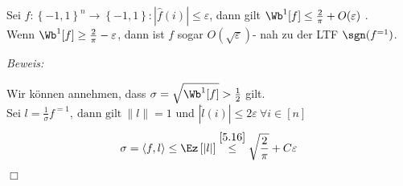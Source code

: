 \documentclass{article}
\newenvironment{proof}{
	\textit{Beweis: \\}
}{
	\begin{flushright}
		$\Box$ 
	\end{flushright}
}
\begin{document}
	 \begin{satz}
		 Sei $f: \left\lbrace -1,1 \right\rbrace^n \to \left\lbrace -1,1 \right\rbrace : \left| \widehat{f}(i) \right| \leq \varepsilon $, dann gilt $ \Wb^1 [f]\leq \frac{2}{\pi} + O(\varepsilon )$ .\\
		 Wenn $\Wb^1[f] \geq \frac{2}{\pi } -\varepsilon $, dann ist $f $ sogar $ O(\sqrt{\varepsilon})$- nah zu der LTF $\sgn (f^{=1})$.

	 
	 \begin{proof}
		Wir k\"onnen annehmen, dass $\sigma = \sqrt{\Wb^1[f]} > \frac{1}{2} $ gilt. \\
		 Sei $l=\frac{1}{\sigma} f^{=1} , \ \text{dann gilt} \ \lVert l \rVert =1 $ und $\left| \widehat{l}(i) \right| \le  2 \varepsilon \ \forall i \in  [n]$ 	 
		\[
			\sigma = \left\langle f,l \right\rangle \le \Ez \left[ \left| l\right|\right] \overset{\ref{5.16}}{\le} \sqrt{\frac{2}{\pi}}+C \varepsilon 
		\]
	 

\end{proof}
\end{satz}
\end{document}
